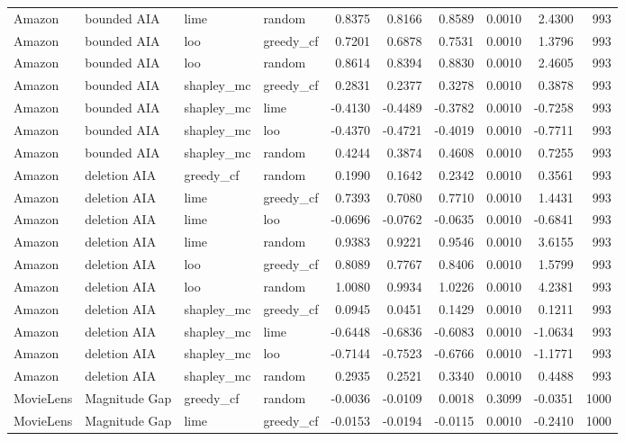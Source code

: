 \begin{longtable}{@{}p{.12\linewidth}p{.18\linewidth}p{.13\linewidth}p{.13\linewidth}rrrrrr@{}}
Amazon & bounded AIA & lime & random & 0.8375 & 0.8166 & 0.8589 & 0.0010 & 2.4300 & 993 \\
Amazon & bounded AIA & loo & greedy\_cf & 0.7201 & 0.6878 & 0.7531 & 0.0010 & 1.3796 & 993 \\
Amazon & bounded AIA & loo & random & 0.8614 & 0.8394 & 0.8830 & 0.0010 & 2.4605 & 993 \\
Amazon & bounded AIA & shapley\_mc & greedy\_cf & 0.2831 & 0.2377 & 0.3278 & 0.0010 & 0.3878 & 993 \\
Amazon & bounded AIA & shapley\_mc & lime & -0.4130 & -0.4489 & -0.3782 & 0.0010 & -0.7258 & 993 \\
Amazon & bounded AIA & shapley\_mc & loo & -0.4370 & -0.4721 & -0.4019 & 0.0010 & -0.7711 & 993 \\
Amazon & bounded AIA & shapley\_mc & random & 0.4244 & 0.3874 & 0.4608 & 0.0010 & 0.7255 & 993 \\
Amazon & deletion AIA & greedy\_cf & random & 0.1990 & 0.1642 & 0.2342 & 0.0010 & 0.3561 & 993 \\
Amazon & deletion AIA & lime & greedy\_cf & 0.7393 & 0.7080 & 0.7710 & 0.0010 & 1.4431 & 993 \\
Amazon & deletion AIA & lime & loo & -0.0696 & -0.0762 & -0.0635 & 0.0010 & -0.6841 & 993 \\
Amazon & deletion AIA & lime & random & 0.9383 & 0.9221 & 0.9546 & 0.0010 & 3.6155 & 993 \\
Amazon & deletion AIA & loo & greedy\_cf & 0.8089 & 0.7767 & 0.8406 & 0.0010 & 1.5799 & 993 \\
Amazon & deletion AIA & loo & random & 1.0080 & 0.9934 & 1.0226 & 0.0010 & 4.2381 & 993 \\
Amazon & deletion AIA & shapley\_mc & greedy\_cf & 0.0945 & 0.0451 & 0.1429 & 0.0010 & 0.1211 & 993 \\
Amazon & deletion AIA & shapley\_mc & lime & -0.6448 & -0.6836 & -0.6083 & 0.0010 & -1.0634 & 993 \\
Amazon & deletion AIA & shapley\_mc & loo & -0.7144 & -0.7523 & -0.6766 & 0.0010 & -1.1771 & 993 \\
Amazon & deletion AIA & shapley\_mc & random & 0.2935 & 0.2521 & 0.3340 & 0.0010 & 0.4488 & 993 \\
MovieLens & Magnitude Gap & greedy\_cf & random & -0.0036 & -0.0109 & 0.0018 & 0.3099 & -0.0351 & 1000 \\
MovieLens & Magnitude Gap & lime & greedy\_cf & -0.0153 & -0.0194 & -0.0115 & 0.0010 & -0.2410 & 1000 \\

\end{longtable}
